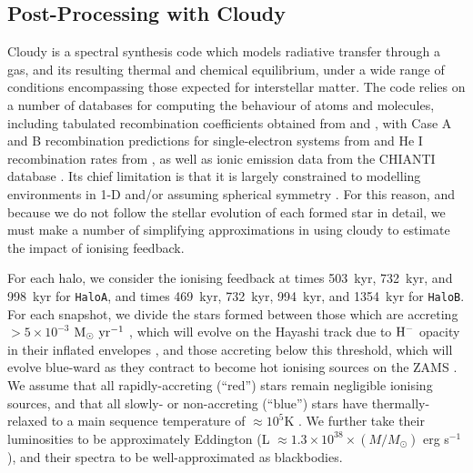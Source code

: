 \documentclass[graphics, twocolumn, usenatbib]{mn2e}
\newcommand{\msolaryr} {$\rm{M_{\odot}~yr^{-1}}~$}
\newcommand{\hac} {\texttt{HaloA}}
\newcommand{\hbc} {\texttt{HaloB}}
\newcommand{\change}[2][]{%
\ifthenelse{\isempty{#2}}{{\color{ForestGreen}{#1}}}%
{{\color{RedOrange}\sout{#1}}{\color{ForestGreen}{ #2}}}%
}
\begin{document}
\subsection{Post-Processing with Cloudy}
\label{cloudy:description}
{\sc Cloudy} \citep{Ferland_2017} is a spectral synthesis code which models radiative transfer through a gas, and its resulting thermal and chemical equilibrium, under a wide range of conditions encompassing those expected for interstellar matter. %
The code relies on a number of databases for computing the behaviour of atoms and molecules, including tabulated recombination coefficients obtained from \cite{Badnell_2003} and \cite{Badnell_2006}, with Case A and B recombination predictions for single-electron systems from \cite{Storey_1995} and He I recombination rates from \cite{Porter_2012}, as well as ionic emission data from the CHIANTI database \citep{Dere_1997,Dere_2012}. Its chief limitation is that it is largely constrained to modelling environments in 1-D and/or assuming spherical symmetry \citep[though see, e.g.,][for recent efforts to extend its implementation to pseudo-3D problems]{Morisset_2013, Fitzgerald_2020}. For this reason, and because we do not follow the stellar evolution of each formed star in detail, we must make a number of simplifying approximations in using {\sc cloudy} to estimate the impact of ionising feedback. 

For each halo, we consider the ionising feedback at times 503~kyr, 732~kyr, and 998~kyr \change[]{after the initial star formation} for \hac, and times 469~kyr, 732~kyr, 994~kyr, and 1354~kyr for \hbc. For each snapshot, we divide the stars formed between those which are accreting $> 5 \times 10^{-3}$ \msolaryr, which will evolve on the Hayashi track due to $\rm{H}^{-}$ opacity in their inflated envelopes \citep[e.g.,][]{Hosokawa_2013}, and those accreting below this threshold, which will evolve blue-ward as they contract to become hot ionising sources on the ZAMS \citep{Haemmerle_2017}. We assume that all rapidly-accreting (``red'') stars remain negligible ionising sources, and that all slowly- or non-accreting (``blue'') stars have thermally-relaxed to a main sequence temperature of $\approx 10^{5}$K \citep{Schaerer_2002, Woods_2020}. We further take their luminosities to be approximately Eddington (L $\approx 1.3\times 10^{38} \times (M/M_{\odot})$ erg s$^{-1}$), and their spectra to be well-approximated as blackbodies.
\end{document}
